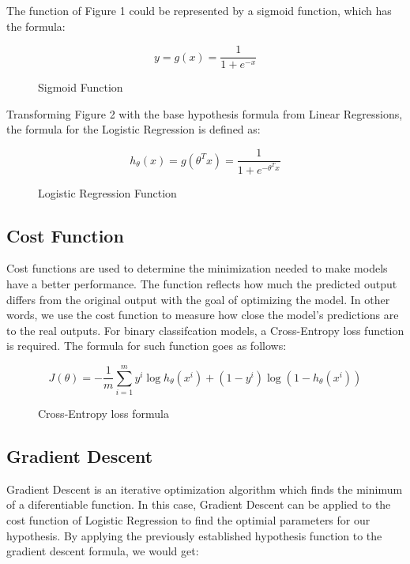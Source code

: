 \documentclass[letterpaper, 10 pt, conference]{ieeeconf}
\begin{document}
The function of Figure 1 could be represented by a sigmoid function, which has the formula:

\begin{figure}[thpb]
    \centering
    \begin{equation}
        y = g(x) = \frac {1}{1 + e^{-x}}
    \end{equation}
    \caption{Sigmoid Function}
    \label{sigmoid_formula}
 \end{figure}

 Transforming Figure 2 with the base hypothesis formula from Linear Regressions, the formula for the Logistic Regression is defined as:

 \begin{figure}[thpb]
    \centering
    \begin{equation}
        h_\theta (x) = g(\theta^Tx) = \frac{1}{1 + e^{-\theta^Tx} }
    \end{equation}
    \caption{Logistic Regression Function}
    \label{logistic_formula}
 \end{figure}

\subsection{Cost Function}
Cost functions are used to determine the minimization needed to make models have a better performance. The function reflects how much
the predicted output differs from the original output with the goal of optimizing the model. In other words, we use the cost function to measure how
close the model's predictions are to the real outputs. For binary classifcation models, a Cross-Entropy loss function is required. The formula
for such function goes as follows:

\begin{figure}[thpb]
    \centering
    \begin{equation}
        J(\theta) = - \frac{1}{m}\sum_{i = 1}^{m} y^i \log h_\theta(x^i) + (1-y^i)\log(1 - h_\theta(x^i))
    \end{equation}
    \caption{Cross-Entropy loss formula}
    \label{cost_formula}
 \end{figure}

\subsection{Gradient Descent}
Gradient Descent is an iterative optimization algorithm which finds the minimum of a diferentiable function. In this case, Gradient Descent
can be applied to the cost function of Logistic Regression to find the optimial parameters for our hypothesis. By applying the previously established
hypothesis function to the gradient descent formula, we would get:
\end{document}
